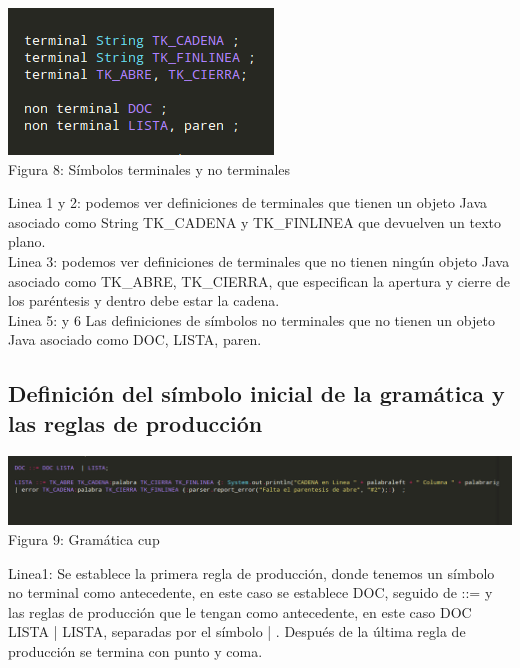 \documentclass[a4paper,openright,12pt]{article}
\begin{document}
\begin{center}
\includegraphics[height=0.17\textheight]{terminales.png}
\\
Figura 8: Símbolos terminales y no terminales
\end{center}

Linea 1 y 2: podemos ver definiciones de terminales que tienen un objeto Java asociado como String TK\_CADENA y  TK\_FINLINEA que devuelven un texto plano.\\

Linea 3: podemos ver definiciones de terminales que no tienen ningún objeto Java asociado como TK\_ABRE, TK\_CIERRA, que especifican la apertura y cierre de los paréntesis y dentro debe estar la cadena.\\

Linea 5: y 6 Las definiciones de símbolos no terminales que no tienen un objeto Java asociado como DOC, LISTA, paren.


\subsection{Definición del símbolo inicial de la gramática y las reglas de producción}
\begin{center}
\includegraphics[height=0.13\textheight]{terminales2.png}
\\
Figura 9: Gramática cup
\end{center}

Linea1: Se establece la primera regla de producción, donde tenemos un símbolo no terminal como antecedente, en este caso  se establece DOC, seguido de ::= y las reglas de producción que le tengan como antecedente, en este caso DOC LISTA | LISTA, separadas por el símbolo | . Después de la última regla de producción se termina con punto y coma.\\
\end{document}
